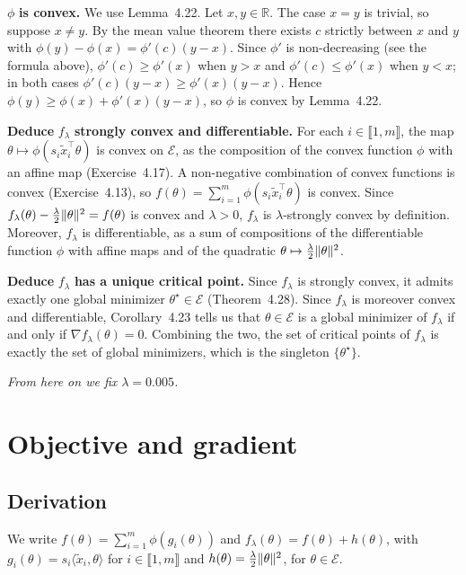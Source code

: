 \documentclass[a4paper,12pt]{article}
\newcommand{\R}{\mathbb{R}}
\newcommand{\E}{\mathcal{E}}
\newcommand{\xt}{\tilde{x}}
\DeclarePairedDelimiter{\norm}{\lVert}{\rVert}
\begin{document}
$\phi$ \textbf{is convex.}
We use Lemma~4.22. Let $x,y \in \R$. The case $x=y$ is trivial, so suppose $x \neq y$.
By the mean value theorem there exists $c$ strictly between $x$ and $y$ with $\phi(y) - \phi(x) = \phi'(c)(y-x)$.
Since $\phi'$ is non-decreasing (see the formula above), $\phi'(c) \geq \phi'(x)$ when $y>x$ and $\phi'(c) \leq \phi'(x)$ when $y<x$; in both cases $\phi'(c)(y-x) \geq \phi'(x)(y-x)$. Hence $\phi(y) \geq \phi(x) + \phi'(x)(y-x)$, so $\phi$ is convex by Lemma~4.22.

\textbf{Deduce} $f_{\lambda}$ \textbf{strongly convex and differentiable.}
For each $i \in \llbracket 1,m \rrbracket$, the map $\theta \mapsto \phi(s_i \xt_i^\top \theta)$ is convex on $\E$, as the composition of the convex function $\phi$ with an affine map (Exercise~4.17).
A non-negative combination of convex functions is convex (Exercise~4.13), so $f(\theta) = \sum_{i=1}^m \phi(s_i \xt_i^\top \theta)$ is convex.
Since $f_{\lambda}(\theta) - \tfrac{\lambda}{2}\norm{\theta}^2 = f(\theta)$ is convex and $\lambda > 0$, $f_{\lambda}$ is $\lambda$-strongly convex by definition.
Moreover, $f_{\lambda}$ is differentiable, as a sum of compositions of the differentiable function $\phi$ with affine maps and of the quadratic $\theta \mapsto \tfrac{\lambda}{2}\norm{\theta}^2$.

\textbf{Deduce} $f_{\lambda}$ \textbf{has a unique critical point.}
Since $f_{\lambda}$ is strongly convex, it admits exactly one global minimizer $\theta^\star \in \E$ (Theorem~4.28).
Since $f_{\lambda}$ is moreover convex and differentiable, Corollary~4.23 tells us that $\theta \in \E$ is a global minimizer of $f_{\lambda}$ if and only if $\nabla f_{\lambda}(\theta) = 0$.
Combining the two, the set of critical points of $f_{\lambda}$ is exactly the set of global minimizers, which is the singleton $\{\theta^\star\}$.

\medskip
\noindent\textit{From here on we fix $\lambda = 0.005$.}
\section{Objective and gradient}\label{sec:q2}

\subsection{Derivation}
We write $f(\theta) = \displaystyle \sum_{i=1}^m \phi(g_i(\theta))$ and $f_{\lambda}(\theta) = f(\theta) + h(\theta)$, with $g_i(\theta) = s_i \langle \xt_i,\theta \rangle$ for $i \in \llbracket 1,m\rrbracket$ and $h(\theta) = \frac{\lambda}{2}\norm{\theta}^2$, for $\theta \in \E$.
\end{document}
